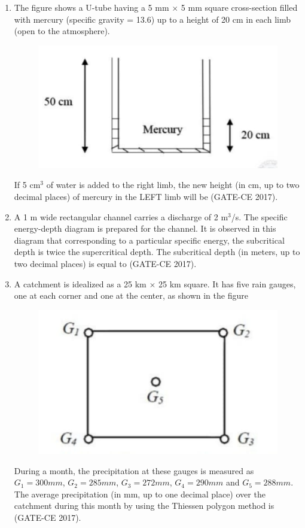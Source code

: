 \documentclass[journal,12pt,onecolumn]{article}
\theoremstyle{remark}
\begin{document}
\begin{enumerate}
    \item The figure  shows a U-tube having a 5 mm $\times$ 5 mm square cross-section filled with mercury (specific gravity = 13.6) up to a height of 20 cm in each limb (open to the atmosphere).
    \begin{figure}[H]
    \centering
    \includegraphics[width=0.7\columnwidth]{figs/q45.jpg}  
    \caption{}
    \label{fig:13}
    \end{figure}
    If 5 cm$^3$ of water is added to the right limb, the new height (in cm, up to two decimal places) of mercury in the LEFT limb will be \underline{\hspace{3cm}} \hfill (GATE-CE 2017).

    \item A 1 m wide rectangular channel carries a discharge of 2 m$^3$/s. The specific energy-depth diagram is prepared for the channel. It is observed in this diagram that corresponding to a particular specific energy, the subcritical depth is twice the supercritical depth. The subcritical depth (in meters, up to two decimal places) is equal to \underline{\hspace{3cm}} \hfill (GATE-CE 2017).

    \item A catchment is idealized as a 25 km $\times$ 25 km square. It has five rain gauges, one at each corner and one at the center, as shown in the figure  
    \begin{figure}[H]
    \centering
    \includegraphics[width=0.7\columnwidth]{figs/q47.jpg}  
    \caption{}
    \label{fig:14}
    \end{figure}
    During a month, the precipitation at these gauges is measured as $ G_1 = 300 mm $, $ G_2 = 285mm $, $ G_3 = 272mm $, $ G_4 = 290mm $ and $ G_5 = 288mm $. The average precipitation (in mm, up to one decimal place) over the catchment during this month by using the Thiessen polygon method is \underline{\hspace{3cm}} \hfill (GATE-CE 2017).


\end{enumerate}
\end{document}
